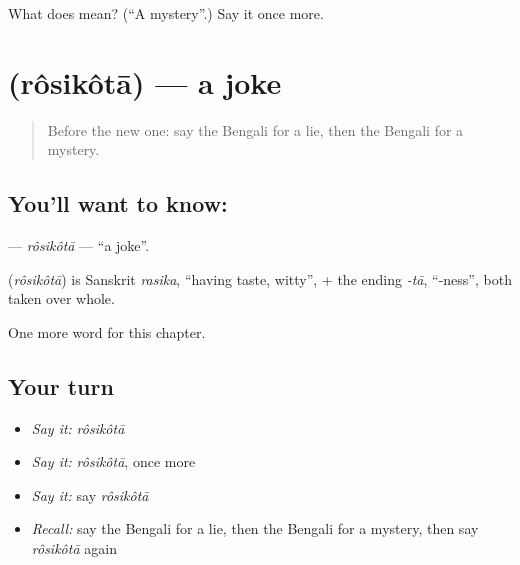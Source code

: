 \begin{tcolorbox}[breakable,colback=teal!4,colframe=teal!35!black,title={Before you move on}]
What does  mean? (\textquotedblleft{}A mystery\textquotedblright{}.) Say it once more.
\end{tcolorbox}
\section[\texorpdfstring{\bn{রসিকতা} (rôsikôtā)}{রসিকতা (rôsikôtā)}]{ (rôsikôtā) — a joke}

\label{lesson:BN-C253-rosikota}



\begin{quote}
Before the new one: say the Bengali for a lie, then the Bengali for a mystery.
\end{quote}

\subsection*{You'll want to know: }
\textbf{} — \emph{rôsikôtā} — \textquotedblleft{}a joke\textquotedblright{}.

\begin{cousinweb}
\textbf{} (\emph{rôsikôtā}) is Sanskrit \emph{rasika}, \textquotedblleft{}having taste, witty\textquotedblright{}, + the ending \emph{-tā}, \textquotedblleft{}-ness\textquotedblright{}, both taken over whole.
\end{cousinweb}

\begin{grammarlens}[title={What you've built}]
One more word for this chapter.
\end{grammarlens}

\subsection*{Your turn}
\begin{itemize}
\raggedright
  \item \emph{Say it:} \emph{rôsikôtā}
  \item \emph{Say it:} \emph{rôsikôtā}, once more
  \item \emph{Say it:} say \emph{rôsikôtā}
  \item \emph{Recall:} say the Bengali for a lie, then the Bengali for a mystery, then say \emph{rôsikôtā} again
\end{itemize}

